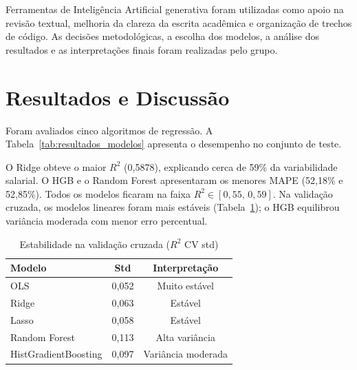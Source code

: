 \documentclass[11pt]{article}
\begin{document}
Ferramentas de Inteligência Artificial generativa foram utilizadas como apoio na revisão textual, melhoria da clareza da escrita acadêmica e organização de trechos de código. As decisões metodológicas, a escolha dos modelos, a análise dos resultados e as interpretações finais foram realizadas pelo grupo.

\section{Resultados e Discussão}

Foram avaliados cinco algoritmos de regressão. A Tabela~\ref{tab:resultados_modelos} apresenta o desempenho no conjunto de teste.

\begin{table}[H]
\centering
\caption{Desempenho dos modelos no conjunto de teste}
\label{tab:resultados_modelos}
\end{table}

O Ridge obteve o maior $R^2$ (0,5878), explicando cerca de 59\% da variabilidade salarial. O HGB e o Random Forest apresentaram os menores MAPE (52,18\% e 52,85\%). Todos os modelos ficaram na faixa $R^2 \in [0{,}55,\,0{,}59]$. Na validação cruzada, os modelos lineares foram mais estáveis (Tabela~\ref{tab:estabilidade}); o HGB equilibrou variância moderada com menor erro percentual.

\begin{table}[H]
\centering
\caption{Estabilidade na validação cruzada ($R^2$ CV std)}
\label{tab:estabilidade}
\small
\begin{tabular}{lcc}
\toprule
\textbf{Modelo} & \textbf{Std} & \textbf{Interpretação} \\
\midrule
OLS & 0,052 & Muito estável \\
Ridge & 0,063 & Estável \\
Lasso & 0,058 & Estável \\
Random Forest & 0,113 & Alta variância \\
HistGradientBoosting & 0,097 & Variância moderada \\
\bottomrule
\end{tabular}
\end{table}
\end{document}
